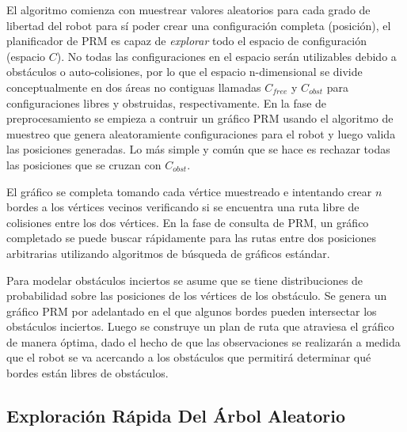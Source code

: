 El algoritmo comienza con muestrear valores aleatorios para cada grado de 
libertad del robot para s\'i poder crear una configuraci\'on completa 
(posici\'on), el planificador de PRM es capaz de \textit{explorar} todo 
el espacio de configuraci\'on (espacio $C$). No todas las configuraciones 
en el espacio ser\'an utilizables debido a obst\'aculos o auto-colisiones, 
por lo que el espacio n-dimensional se divide conceptualmente en dos \'areas 
no contiguas llamadas $C_{free}$ y $C_{obst}$ para configuraciones libres y 
obstruidas, respectivamente. En la fase de preprocesamiento se empieza a 
contruir un gr\'afico PRM usando el algoritmo de muestreo que genera 
aleatoramiente configuraciones para el robot y luego valida las 
posiciones generadas. Lo m\'as simple y com\'un que se hace es rechazar 
todas las posiciones que se cruzan con $C_{obst}$. 

El gr\'afico se completa tomando cada v\'ertice muestreado e intentando 
crear $n$ bordes a los v\'ertices vecinos verificando si se encuentra una 
ruta libre de colisiones entre los dos v\'ertices. En la fase de consulta 
de PRM, un gr\'afico completado se puede buscar r\'apidamente para las 
rutas entre dos posiciones arbitrarias utilizando algoritmos de 
b\'usqueda de gr\'aficos est\'andar.

Para modelar obst\'aculos inciertos se asume que se tiene distribuciones 
de probabilidad sobre las posiciones de los v\'ertices de los obst\'aculo. Se 
genera un gr\'afico PRM por adelantado en el que algunos bordes pueden 
intersectar los obst\'aculos inciertos. Luego se construye un plan de 
ruta que atraviesa el gr\'afico de manera \'optima, dado el hecho de 
que las observaciones se realizar\'an a medida que el robot se va acercando a 
los obst\'aculos que permitir\'a determinar qu\'e bordes est\'an 
libres de obst\'aculos.

\subsection{Exploraci\'on R\'apida Del \'Arbol Aleatorio}



